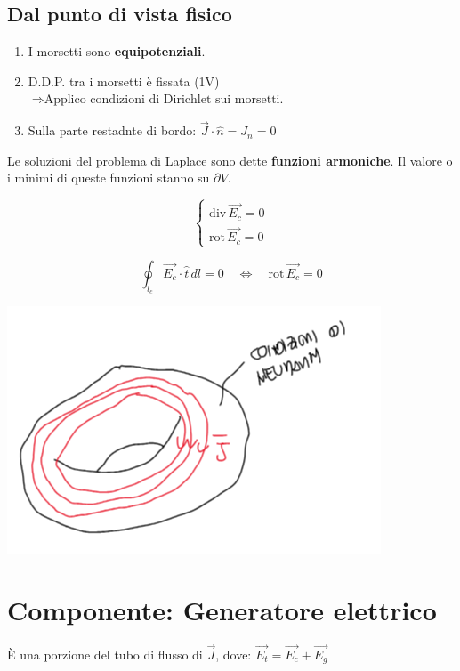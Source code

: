 \subsection*{Dal punto di vista fisico}
\begin{enumerate}[label=\alph*)]
  \item I morsetti sono \textbf{equipotenziali}.
  \item D.D.P. tra i morsetti è fissata (1V) $\Rightarrow \text{Applico condizioni di Dirichlet sui morsetti.}$
  \item  Sulla parte restadnte di bordo: $\vec{J} \cdot \hat{n} = J_n = 0$
\end{enumerate}

Le soluzioni del problema di Laplace sono dette \textbf{funzioni armoniche}.  
Il valore o i minimi di queste funzioni stanno su $\partial V$.

\[
\begin{cases}
\mathrm{div}\,\vec{E_c} = 0 \\[6pt]
\mathrm{rot}\,\vec{E_c} = 0
\end{cases}
\]

\[
\oint_{l_c} \vec{E_c} \cdot \hat{t}\, dl = 0 
\quad \Longleftrightarrow \quad 
\mathrm{rot}\,\vec{E_c} = 0
\]

\begin{center}
    \includegraphics[scale = 0.7]{immagini/image17.png}
\end{center}

\section{Componente: Generatore elettrico}

È una porzione del tubo di flusso di $\vec{J}$, dove: $\vec{E_t} = \vec{E_c} + \vec{E_g}$

